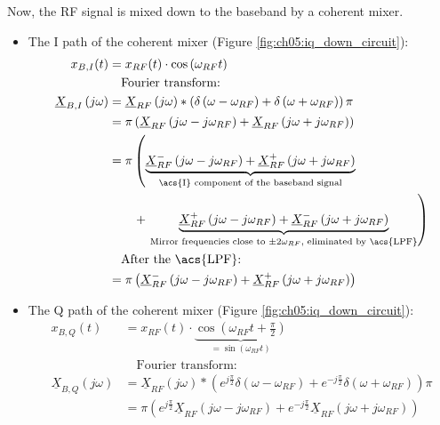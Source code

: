 \begin{refsection}
Now, the \ac{RF} signal is mixed down to the baseband by a coherent mixer.
\begin{itemize}
	\item The \ac{I} path of the coherent mixer (Figure \ref{fig:ch05:iq_down_circuit}):
	\begin{equation}
		\begin{split}
			x_{B,I}(t) &= x_{RF}(t) \cdot \cos\left(\omega_{RF} t\right) \\
			 &\quad \text{Fourier transform:} \\
			\underline{X}_{B,I}\left(j\omega\right) &= \underline{X}_{RF}\left(j\omega\right) * \left(\delta\left(\omega-\omega_{RF}\right) + \delta\left(\omega+\omega_{RF}\right)\right) \pi \\
			 &= \pi \left(\underline{X}_{RF}\left(j\omega-j\omega_{RF}\right) + \underline{X}_{RF}\left(j\omega+j\omega_{RF}\right)\right) \\
			 &= \pi \left(\underbrace{\underline{X}_{RF}^{-}\left(j\omega-j\omega_{RF}\right) + \underline{X}_{RF}^{+}\left(j\omega+j\omega_{RF}\right)}_{\text{\acs{I} component of the baseband signal}} \right. \\ &\qquad + \left. \underbrace{\underline{X}_{RF}^{+}\left(j\omega-j\omega_{RF}\right) + \underline{X}_{RF}^{-}\left(j\omega+j\omega_{RF}\right)}_{\text{Mirror frequencies close to $\pm 2 \omega_{RF}$, eliminated by \acs{LPF}}} \right) \\
			 &\quad \text{After the \acs{LPF}:} \\
			 &= \pi \left(\underline{X}_{RF}^{-}\left(j\omega-j\omega_{RF}\right) + \underline{X}_{RF}^{+}\left(j\omega+j\omega_{RF}\right) \right)
		\end{split}
	\end{equation}
	\item The \ac{Q} path of the coherent mixer (Figure \ref{fig:ch05:iq_down_circuit}):
	\begin{equation}
		\begin{split}
			x_{B,Q}(t) &= x_{RF}(t) \cdot \underbrace{\cos\left(\omega_{RF} t + \frac{\pi}{2}\right)}_{= \sin\left(\omega_{RF} t\right)} \\
			 &\quad \text{Fourier transform:} \\
			\underline{X}_{B,Q}\left(j\omega\right) &= \underline{X}_{RF}\left(j\omega\right) * \left(e^{j\frac{\pi}{2}} \delta\left(\omega-\omega_{RF}\right) + e^{-j\frac{\pi}{2}} \delta\left(\omega+\omega_{RF}\right)\right) \pi \\
			 &= \pi \left(e^{j\frac{\pi}{2}}\underline{X}_{RF}\left(j\omega-j\omega_{RF}\right) + e^{-j\frac{\pi}{2}}\underline{X}_{RF}\left(j\omega+j\omega_{RF}\right)\right) \\

\end{split}
\end{equation}
\end{itemize}
\end{refsection}
